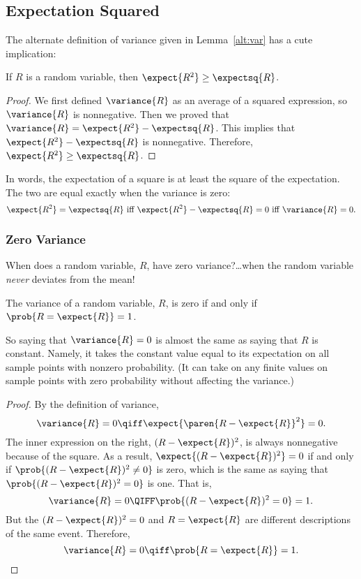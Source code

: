 \begin{editingnotes}
\subsection{Expectation Squared}

The alternate definition of variance given in Lemma~\ref{alt:var} has
a cute implication:
\begin{corollary}
If $R$ is a random variable, then $\expect{R^2} \geq \expectsq{R}$.
\end{corollary}
\begin{proof}
We first defined $\variance{R}$ as an average of a squared expression, so
$\variance{R}$ is nonnegative.  Then we proved that $\variance{R} =
\expect{R^2} - \expectsq{R}$.  This implies that $\expect{R^2} -
\expectsq{R}$ is nonnegative.  Therefore, $\expect{R^2} \geq
\expectsq{R}$.
\end{proof}

In words, the expectation of a square is at least the square of the
expectation. The two are equal exactly when the variance is zero:
\begin{displaymath}
\expect{R^2} = \expectsq{R} \text{  iff  } \expect{R^2} - \expectsq{R} = 0
\text{  iff  } \variance{R} = 0.
\end{displaymath}

\subsubsection*{Zero Variance}

When does a random variable, $R$, have zero variance?\dots when the random
variable \emph{never} deviates from the mean!
\begin{lemma*}%
The variance of a random variable, $R$, is zero if and only if $\prob{R =
\expect{R}} = 1$.
\end{lemma*}

So saying that $\variance{R}=0$ is almost the same as saying that $R$ is
constant.  Namely, it takes the constant value equal to its expectation on
all sample points with nonzero probability.  (It can take on any finite
values on sample points with zero probability without affecting the
variance.)

\begin{proof}
By the definition of variance,
\[
\variance{R} = 0\qiff \expect{\paren{R - \expect{R}}^2} = 0.
\]
The inner expression on the right, $(R - \expect{R})^2$, is always
nonnegative because of the square.  As a result, $\expect{(R -
\expect{R})^2} = 0$ if and only if $\prob{(R - \expect{R})^2 \neq 0}$ is
zero, which is the same as saying that $\prob{(R - \expect{R})^2 = 0}$ is
one.  That is,
\[
\variance{R} = 0 \QIFF \prob{(R - \expect{R})^2 = 0} = 1.
\]
But the $(R - \expect{R})^2 = 0$ and $R = \expect{R}$ are different
descriptions of the same event.  Therefore,
\[
\variance{R} = 0 \qiff \prob{R = \expect{R}} =1.
\]
\end{proof}

\end{editingnotes}

